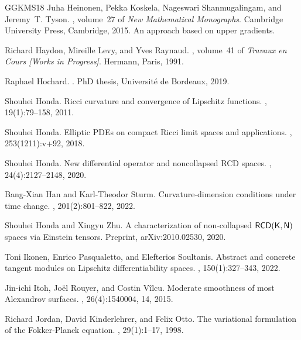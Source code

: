 \documentclass[11pt]{article}
\numberwithin{equation}{section}
\begin{document}
{\begin{thebibliography}{GGKMS18}
Juha Heinonen, Pekka Koskela, Nageswari Shanmugalingam, and Jeremy~T. Tyson.
, volume~27 of {\em New
  Mathematical Monographs}.
\newblock Cambridge University Press, Cambridge, 2015.
\newblock An approach based on upper gradients.

Richard Haydon, Mireille Levy, and Yves Raynaud.
, volume~41 of {\em Travaux en Cours
  [Works in Progress]}.
\newblock Hermann, Paris, 1991.

Raphael Hochard.
.
\newblock PhD thesis, Universit\'e de Bordeaux, 2019.

Shouhei Honda.
\newblock Ricci curvature and convergence of {L}ipschitz functions.
, 19(1):79--158, 2011.

Shouhei Honda.
\newblock Elliptic {PDE}s on compact {R}icci limit spaces and applications.
, 253(1211):v+92, 2018.

Shouhei Honda.
\newblock New differential operator and noncollapsed {RCD} spaces.
, 24(4):2127--2148, 2020.

Bang-Xian Han and Karl-Theodor Sturm.
\newblock Curvature-dimension conditions under time change.
, 201(2):801--822, 2022.

Shouhei Honda and Xingyu Zhu.
\newblock A characterization of non-collapsed {$\sf{RCD}(K,N)$} spaces via
  {E}instein tensors.
\newblock Preprint, arXiv:2010.02530, 2020.

Toni Ikonen, Enrico Pasqualetto, and Elefterios Soultanis.
\newblock Abstract and concrete tangent modules on {L}ipschitz
  differentiability spaces.
, 150(1):327--343, 2022.

Jin-ichi Itoh, Jo\"{e}l Rouyer, and Costin V\^{i}lcu.
\newblock Moderate smoothness of most {A}lexandrov surfaces.
, 26(4):1540004, 14, 2015.

Richard Jordan, David Kinderlehrer, and Felix Otto.
\newblock The variational formulation of the {F}okker-{P}lanck equation.
, 29(1):1--17, 1998.


\end{thebibliography}}
\end{document}
